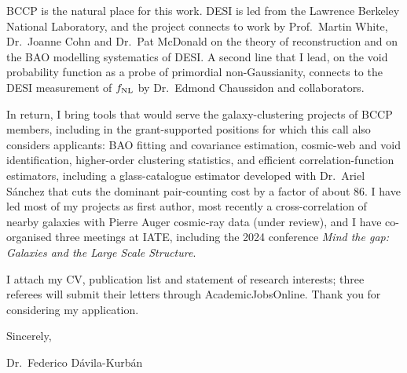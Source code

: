\documentclass[11pt,a4paper]{article}
\begin{document}
BCCP is the natural place for this work. DESI is led from the Lawrence Berkeley National Laboratory, and the project connects to work by Prof.~Martin White, Dr.~Joanne Cohn and Dr.~Pat McDonald on the theory of reconstruction and on the BAO modelling systematics of DESI. A second line that I lead, on the void probability function as a probe of primordial non-Gaussianity, connects to the DESI measurement of $f_{\rm NL}$ by Dr.~Edmond Chaussidon and collaborators. 

In return, I bring tools that would serve the galaxy-clustering projects of BCCP members, including in the grant-supported positions for which this call also considers applicants: BAO fitting and covariance estimation, cosmic-web and void identification, higher-order clustering statistics, and efficient correlation-function estimators, including a glass-catalogue estimator developed with Dr.~Ariel S\'anchez that cuts the dominant pair-counting cost by a factor of about 86. I have led most of my projects as first author, most recently a cross-correlation of nearby galaxies with Pierre Auger cosmic-ray data (under review), and I have co-organised three meetings at IATE, including the 2024 conference \textit{Mind the gap: Galaxies and the Large Scale Structure}.

I attach my CV, publication list and statement of research interests; three referees will submit their letters through AcademicJobsOnline. Thank you for considering my application.

\vspace{4pt}
\hspace{0.45\textwidth}Sincerely,

\vspace{16pt}
\hspace{0.45\textwidth}Dr.\ Federico D\'avila-Kurb\'an
\end{document}
